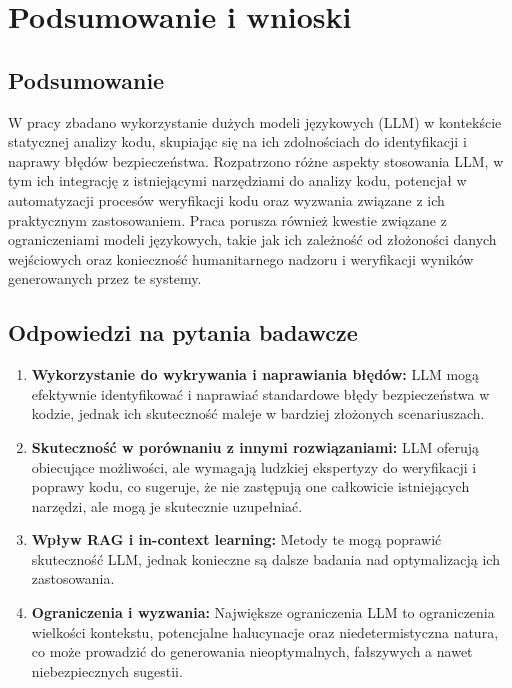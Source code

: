 
\chapter*{Podsumowanie i wnioski}

\section*{Podsumowanie}
W pracy zbadano wykorzystanie dużych modeli językowych (LLM) w kontekście statycznej analizy kodu, skupiając się na ich zdolnościach do identyfikacji i naprawy błędów bezpieczeństwa. Rozpatrzono różne aspekty stosowania LLM, w tym ich integrację z istniejącymi narzędziami do analizy kodu, potencjał w automatyzacji procesów weryfikacji kodu oraz wyzwania związane z ich praktycznym zastosowaniem. Praca porusza również kwestie związane z ograniczeniami modeli językowych, takie jak ich zależność od złożoności danych wejściowych oraz konieczność humanitarnego nadzoru i weryfikacji wyników generowanych przez te systemy.

\section*{Odpowiedzi na pytania badawcze}
\begin{enumerate}
    \item \textbf{Wykorzystanie do wykrywania i naprawiania błędów:} LLM mogą efektywnie identyfikować i naprawiać standardowe błędy bezpieczeństwa w kodzie, jednak ich skuteczność maleje w bardziej złożonych scenariuszach.
    \item \textbf{Skuteczność w porównaniu z innymi rozwiązaniami:} LLM oferują obiecujące możliwości, ale wymagają ludzkiej ekspertyzy do weryfikacji i poprawy kodu, co sugeruje, że nie zastępują one całkowicie istniejących narzędzi, ale mogą je skutecznie uzupełniać.
    \item \textbf{Wpływ RAG i in-context learning:} Metody te mogą poprawić skuteczność LLM, jednak konieczne są dalsze badania nad optymalizacją ich zastosowania.
    \item \textbf{Ograniczenia i wyzwania:} Największe ograniczenia LLM to ograniczenia wielkości kontekstu, potencjalne halucynacje oraz niedetermistyczna natura, co może prowadzić do generowania nieoptymalnych, fałszywych a nawet niebezpiecznych sugestii.
\end{enumerate}

